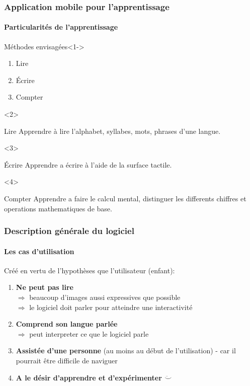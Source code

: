 \documentclass[15pt]{beamer}
\begin{document}
\begin{frame}
 \frametitle{Application mobile pour l'apprentissage}
 \framesubtitle{Particularit\'es de l'apprentissage}
\begin{block}{M\'ethodes envisag\'ees}<1->
\begin{enumerate}
  \item Lire
  \item \'Ecrire
  \item Compter
\end{enumerate}
\end{block}

\begin{overlayarea}{\textwidth}{3cm}
\begin{onlyenv}<2>
\begin{exampleblock}{Lire}
Apprendre \`a lire l'alphabet, syllabes, mots, phrases d'une langue.
\end{exampleblock}
\end{onlyenv}

\begin{onlyenv}<3>
\begin{exampleblock}{\'Ecrire}
Apprendre a \'ecrire \`a l'aide de la surface tactile.
\end{exampleblock}
\end{onlyenv}

\begin{onlyenv}<4>
\begin{exampleblock}{Compter}
Apprendre a faire le calcul mental, distinguer les differents chiffres et
operations mathematiques de base.
\end{exampleblock}
\end{onlyenv}
\end{overlayarea}

\end{frame}


\begin{frame}
 \frametitle{Description g\'en\'erale du logiciel}
 \framesubtitle{Les cas d'utilisation}

Cr\'e\'e en vertu de l'hypoth\`eses que l'utilisateur (enfant):

\begin{enumerate}
 \item<1-> \textbf{Ne peut pas lire} \\
  $\Rightarrow$ beaucoup d'images aussi expressives que possible\\
  $\Rightarrow$ le logiciel doit parler pour atteindre une interactivit\'e
 \item<2-> \textbf{Comprend son langue parl\'ee} \\
  $\Rightarrow$ peut interpreter ce que le logiciel parle
 \item<3-> \textbf{Assist\'ee d'une personne} (au moins au d\'ebut de l'utilisation) - car il 
  pourrait \^etre difficile de naviguer
 \item<4-> \textbf{A le d\'esir d'apprendre et d'exp\'erimenter $\ddot\smile$}
\end{enumerate}
\end{frame}
\end{document}
